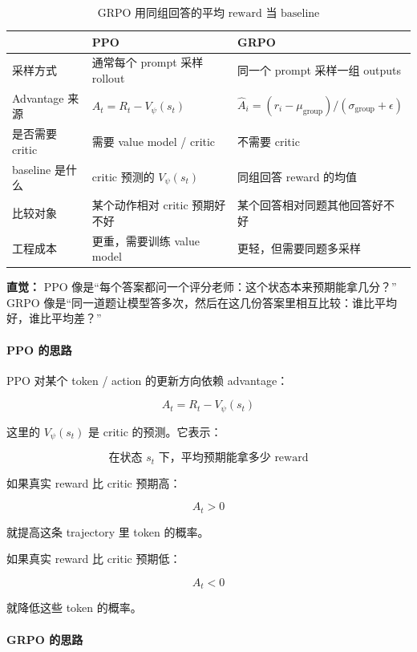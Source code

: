 \[
\text{GRPO 用同组回答的平均 reward 当 baseline}
\]

\begin{center}
{\small
\begin{tabular}{p{3cm}p{4.8cm}p{4.8cm}}
\hline
 & \textbf{PPO} & \textbf{GRPO} \\
\hline
采样方式
&
通常每个 prompt 采样 rollout
&
同一个 prompt 采样一组 outputs
\\
Advantage 来源
&
$A_t = R_t - V_\psi(s_t)$
&
$\hat{A}_i = (r_i-\mu_\text{group})/(\sigma_\text{group}+\epsilon)$
\\
是否需要 critic
&
需要 value model / critic
&
不需要 critic
\\
baseline 是什么
&
critic 预测的 $V_\psi(s_t)$
&
同组回答 reward 的均值
\\
比较对象
&
某个动作相对 critic 预期好不好
&
某个回答相对同题其他回答好不好
\\
工程成本
&
更重，需要训练 value model
&
更轻，但需要同题多采样
\\
\hline
\end{tabular}
}
\end{center}

\begin{intubox}
\textbf{直觉：} PPO 像是“每个答案都问一个评分老师：这个状态本来预期能拿几分？”\\
GRPO 像是“同一道题让模型答多次，然后在这几份答案里相互比较：谁比平均好，谁比平均差？”
\end{intubox}

\paragraph{PPO 的思路}

PPO 对某个 token / action 的更新方向依赖 advantage：

\[
A_t = R_t - V_\psi(s_t)
\]

这里的 $V_\psi(s_t)$ 是 critic 的预测。它表示：

\[
\text{在状态 } s_t \text{ 下，平均预期能拿多少 reward}
\]

如果真实 reward 比 critic 预期高：

\[
A_t > 0
\]

就提高这条 trajectory 里 token 的概率。

如果真实 reward 比 critic 预期低：

\[
A_t < 0
\]

就降低这些 token 的概率。

\paragraph{GRPO 的思路}

